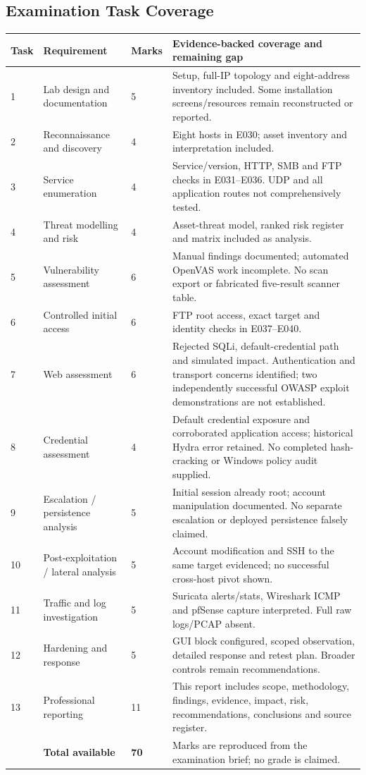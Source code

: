 \documentclass[11pt,a4paper]{article}
\begin{document}
\subsection{Examination Task Coverage}
\small
\begin{longtable}{@{}L{0.7cm}L{3.5cm}L{1.1cm}L{10.1cm}@{}}
\toprule
\textbf{Task} & \textbf{Requirement} & \textbf{Marks} & \textbf{Evidence-backed coverage and remaining gap}\\
\midrule{} & Lab design and documentation & 5 & Setup, full-IP topology and eight-address inventory included. Some installation screens/resources remain reconstructed or reported.\\
2 & Reconnaissance and discovery & 4 & Eight hosts in E030; asset inventory and interpretation included.\\
3 & Service enumeration & 4 & Service/version, HTTP, SMB and FTP checks in E031--E036. UDP and all application routes not comprehensively tested.\\
4 & Threat modelling and risk & 4 & Asset-threat model, ranked risk register and matrix included as analysis.\\
5 & Vulnerability assessment & 6 & Manual findings documented; automated OpenVAS work incomplete. No scan export or fabricated five-result scanner table.\\
6 & Controlled initial access & 6 & FTP root access, exact target and identity checks in E037--E040.\\
7 & Web assessment & 6 & Rejected SQLi, default-credential path and simulated impact. Authentication and transport concerns identified; two independently successful OWASP exploit demonstrations are not established.\\
8 & Credential assessment & 4 & Default credential exposure and corroborated application access; historical Hydra error retained. No completed hash-cracking or Windows policy audit supplied.\\
9 & Escalation / persistence analysis & 5 & Initial session already root; account manipulation documented. No separate escalation or deployed persistence falsely claimed.\\
10 & Post-exploitation / lateral analysis & 5 & Account modification and SSH to the same target evidenced; no successful cross-host pivot shown.\\
11 & Traffic and log investigation & 5 & Suricata alerts/stats, Wireshark ICMP and pfSense capture interpreted. Full raw logs/PCAP absent.\\
12 & Hardening and response & 5 & GUI block configured, scoped observation, detailed response and retest plan. Broader controls remain recommendations.\\
13 & Professional reporting & 11 & This report includes scope, methodology, findings, evidence, impact, risk, recommendations, conclusions and source register.\\
\midrule
 & \textbf{Total available} & \textbf{70} & Marks are reproduced from the examination brief; no grade is claimed.\\
\bottomrule
\end{longtable}
\normalsize
\end{document}
